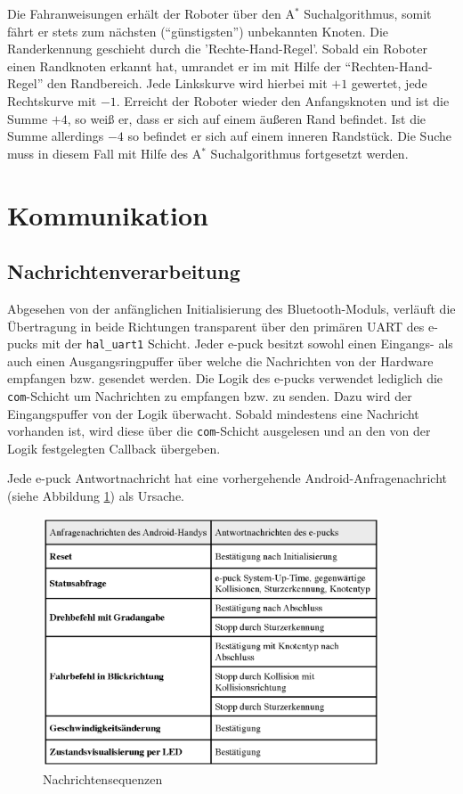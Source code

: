 \documentclass[10pt,a4paper]{article}
\begin{document}
  			Die Fahranweisungen erhält der Roboter über den A$^\ast$ Suchalgorithmus, somit fährt er stets zum nächsten (``günstigsten'') unbekannten
  			Knoten. Die Randerkennung geschieht durch die 'Rechte-Hand-Regel'. Sobald ein Roboter einen Randknoten erkannt hat, umrandet er im
			mit Hilfe der ``Rechten-Hand-Regel'' den Randbereich. Jede Linkskurve wird hierbei mit $+1$ gewertet, jede Rechtskurve mit $-1$. Erreicht der Roboter wieder
			den Anfangsknoten und ist die Summe $+4$, so weiß er, dass er sich auf einem äußeren Rand befindet. Ist die Summe allerdings $-4$
			so befindet er sich auf einem inneren Randstück. Die Suche muss in diesem Fall mit Hilfe des A$^\ast$ Suchalgorithmus fortgesetzt werden.	
	\section{Kommunikation}
		\subsection{Nachrichtenverarbeitung}
			{Abgesehen von der anfänglichen Initialisierung des Bluetooth-Moduls, verläuft die Übertragung in beide
			Richtungen transparent über den primären UART des e-pucks mit der {\tt hal\_uart1} Schicht. Jeder e-puck besitzt
			sowohl einen Eingangs- als auch	einen Ausgangsringpuffer über welche die Nachrichten von der Hardware empfangen
			bzw. gesendet werden. Die Logik des e-pucks verwendet lediglich die {\tt com}-Schicht um Nachrichten zu
			empfangen bzw. zu senden. Dazu wird der Eingangspuffer von der Logik überwacht. Sobald mindestens eine Nachricht
			vorhanden ist, wird diese über die	{\tt com}-Schicht ausgelesen und an den von der Logik festgelegten Callback
			übergeben.

			Jede e-puck Antwortnachricht hat eine vorhergehende Android-Anfragenachricht (siehe Abbildung \ref{fig:nachrichtensequenzen}) als Ursache.
		 	\begin{figure}[h]
				\centering
				\includegraphics[width=10cm]{images/epuck_bt_msgs.eps}
  				\caption{Nachrichtensequenzen}
  				\label{fig:nachrichtensequenzen}
  			\end{figure}					
			}
\end{document}
